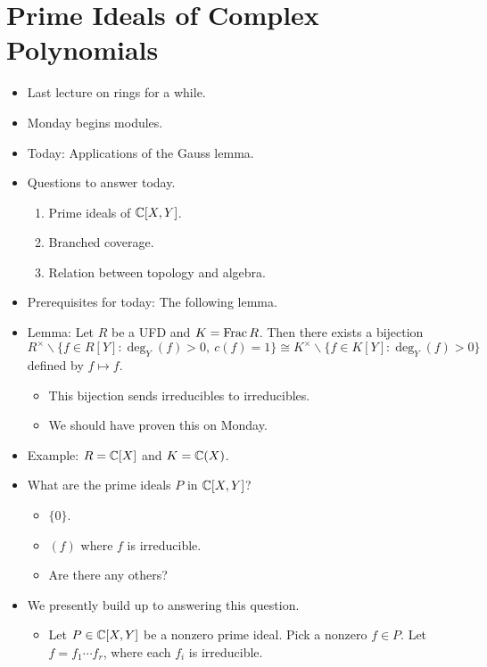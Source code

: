 \documentclass[../notes.tex]{subfiles}
\begin{document}
\section{Prime Ideals of Complex Polynomials}
\begin{itemize}
    \item {}Last lecture on rings for a while.
    \item Monday begins modules.
    \item Today: Applications of the Gauss lemma.
    \item Questions to answer today.
    \begin{enumerate}
        \item Prime ideals of $\mathbb{C}[X,Y]$.
        \item Branched coverage.
        \item Relation between topology and algebra.
    \end{enumerate}
    \item Prerequisites for today: The following lemma.
    \item Lemma: Let $R$ be a UFD and $K=\operatorname{Frac} R$. Then there exists a bijection
    \begin{equation*}
        R^\times\backslash\{f\in R[Y]:\deg_Y(f)>0,\ c(f)=1\} \cong K^\times\backslash\{f\in K[Y]:\deg_{Y}(f)>0\}
    \end{equation*}
    defined by $f\mapsto f$.
    \begin{itemize}
        \item This bijection sends irreducibles to irreducibles.
        \item We should have proven this on Monday.
    \end{itemize}
    \item Example: $R=\mathbb{C}[X]$ and $K=\mathbb{C}(X)$.
    \item What are the prime ideals $P$ in $\mathbb{C}[X,Y]$?
    \begin{itemize}
        \item $\{0\}$.
        \item $(f)$ where $f$ is irreducible.
        \item Are there any others?
    \end{itemize}
    \item We presently build up to answering this question.
    \begin{itemize}
        \item Let $P\in\mathbb{C}[X,Y]$ be a nonzero prime ideal. Pick a nonzero $f\in P$. Let $f=f_1\cdots f_r$, where each $f_i$ is irreducible.

\end{itemize}
\end{itemize}
\end{document}
